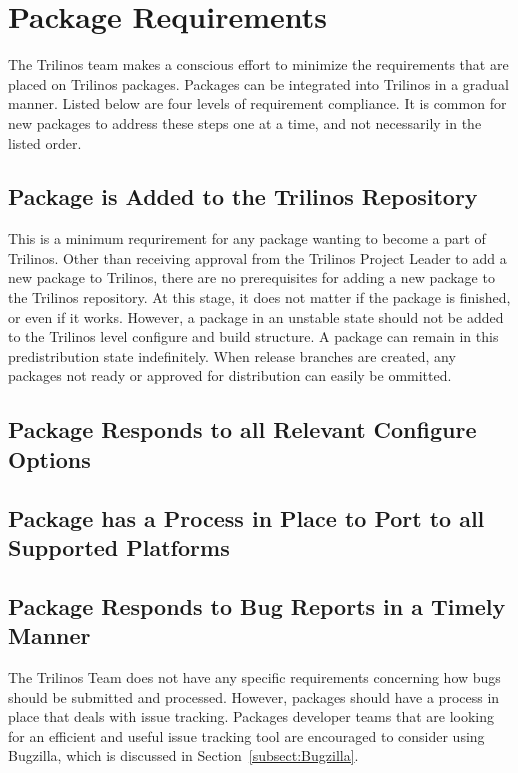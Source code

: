 \documentclass[12pt,relax]{TrilinosDevGuide}
\begin{document}

\section{Package Requirements}
\label{Section:PackageRequirements}
The Trilinos team makes a conscious effort to minimize the requirements that 
are placed on Trilinos packages.  Packages can be integrated into Trilinos in 
a gradual manner.  Listed below are four levels of requirement compliance.  
It is common for new packages to address these steps one at a time, and not 
necessarily in the listed order.

\subsection{Package is Added to the Trilinos Repository}

This is a minimum requrirement for any package wanting to become a part of 
Trilinos.  Other than receiving approval from the Trilinos Project Leader to 
add a new package to Trilinos, there are no prerequisites for adding a new 
package to the Trilinos repository.  At this stage, it does not matter if the 
package is finished, or even if it works.  However, a package in an unstable 
state should not be added to the Trilinos level configure and build 
structure.  A package can remain in this predistribution state indefinitely.  
When release branches are created, any packages not ready or approved for 
distribution can easily be ommitted.

\subsection{Package Responds to all Relevant Configure Options}


\subsection{Package has a Process in Place to Port to all Supported Platforms}

\subsection{Package Responds to Bug Reports in a Timely Manner}

The Trilinos Team does not have any specific requirements concerning how 
bugs should be submitted and processed.  However, packages should have a 
process in place that deals with issue tracking.  Packages developer teams 
that are looking for an efficient and useful issue tracking tool are 
encouraged to consider using Bugzilla, which is discussed in 
Section~\ref{subsect:Bugzilla}.
\end{document}
